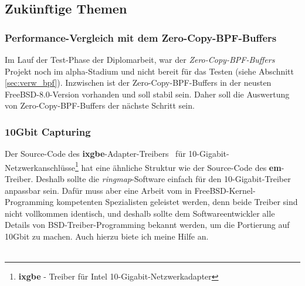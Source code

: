 \subsection{Zukünftige Themen}
\subsubsection{Performance-Vergleich mit dem Zero-Copy-BPF-Buffers}
Im Lauf der Test-Phase der Diplomarbeit, war der \emph{Zero-Copy-BPF-Buffers}
Projekt noch im alpha-Stadium und nicht bereit für das Testen (siehe Abschnitt
\ref{sec:verw_bpf}). Inzwischen ist der Zero-Copy-BPF-Buffers in der neusten
FreeBSD-8.0-Version vorhanden und soll stabil sein. Daher soll die Auswertung 
von Zero-Copy-BPF-Buffers der nächste Schritt sein.
\subsubsection{10Gbit Capturing}
Der Source-Code des \textbf{ixgbe}-Adapter-Treibers~\cite{10gbit_adapter_bsd}
für 10-Gigabit-Netzwerkanschlüsse\footnote{\textbf{ixgbe} - Treiber für Intel
10-Gigabit-Netzwerkadapter} hat eine ähnliche Struktur wie der Source-Code des
\textbf{em}-Treiber. Deshalb sollte die \emph{ringmap}-Software einfach für den
10-Gigabit-Treiber anpassbar sein. Dafür muss aber eine Arbeit vom in
FreeBSD-Kernel-Programming kompetenten Spezialisten geleistet werden, denn
beide Treiber sind nicht vollkommen identisch, und deshalb sollte dem
Softwareentwickler alle Details von BSD-Treiber-Programming bekannt werden, um
die Portierung auf 10Gbit zu machen. Auch hierzu biete ich meine Hilfe an.\\\\
